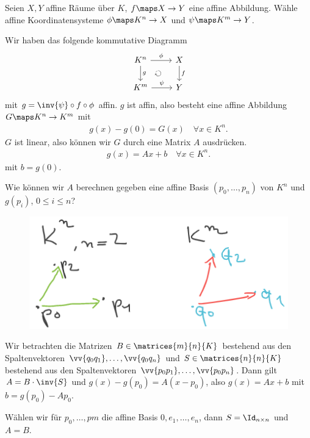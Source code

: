 Seien \( X,Y \) affine Räume über \( K \), \( f\maps X\to Y \) eine affine Abbildung. Wähle affine Koordinatensysteme \( \phi\maps K^n\to X  \) und \( \psi\maps K^m\to Y \).

Wir haben das folgende kommutative Diagramm
\begin{equation*}
    \begin{tikzcd}
        K^n\arrow{r}{\phi}\arrow{d}[name=g]{g} &X\arrow{d}[name=f]{f}\\
        K^m\arrow{r}{\psi}&Y
        \arrow[to path={(f) node[midway,scale=1] {\rotatebox{90}{\(\circlearrowright\)}} (g)}]{} 
    \end{tikzcd}    
\end{equation*}
mit \( g=\inv{\psi}\circ f\circ \phi \) affin. \( g \) ist affin, also besteht eine affine Abbildung \( G\maps K^n\to K^m \) mit
\begin{align*}
    g(x)-g(0)=G(x)\quad \forall x\in K^n.
\end{align*}
\( G \) ist linear, also können wir \( G \) durch eine Matrix \( A \) ausdrücken.
\begin{align*}
    g(x)=Ax+b\quad \forall x\in K^n.
\end{align*}
mit \( b=g(0) \).
\begin{frage*}
    Wie können wir \( A \) berechnen gegeben eine affine Basis \( (p_0,\dotsc,p_n) \) von \( K^n \) und \( g(p_i) \), \( 0\leq i \leq n \)?
\end{frage*}
\begin{figure}[H]
    \centering
    \includegraphics[width=0.5\linewidth]{figures/affine_basen_abbildung_wunsch}
    \label{fig:affine_basen_abbildung_wunsch}
\end{figure}
Wir betrachten die Matrizen \( B\in \matrices{m}{n}{K} \) bestehend aus den Spaltenvektoren \( \vv{q_0 q_1},\dotsc, \vv{q_0 q_n} \) und \( S\in \matrices{n}{n}{K} \) bestehend aus den Spaltenvektoren \( \vv{p_0 p_1}, \dotsc, \vv{p_0 p_n} \). Dann gilt \( A=B\cdot \inv{S}  \) und \( g(x)-g(p_0)=A(x-p_0) \), also \( g(x)=Ax+b \) mit \( b=g(p_0)-Ap_0 \).
\begin{bemerkung*}
    Wählen wir für \( p_0,\dotsc,pm \) die affine Basis \( 0,e_1,\dotsc, e_n \), dann \( S=\Id_{n\times n} \) und \( A=B \).
\end{bemerkung*}
